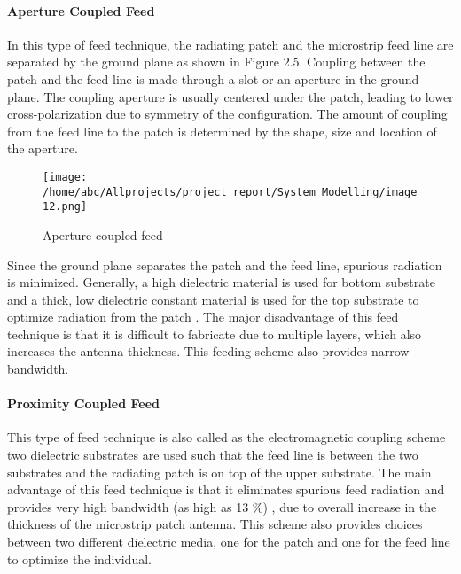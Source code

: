 \documentclass[12pt]{article}
\begin{document}
					                   
					                \paragraph{Aperture Coupled Feed}
					                 \justify
					                  In this type of feed technique, the radiating patch and the microstrip feed line are separated by the ground plane as shown in Figure 2.5. Coupling between the patch and the feed line is made through a slot or an aperture in the ground plane.  The coupling aperture is usually centered under the patch, leading to lower cross-polarization due to symmetry of the configuration. The amount of coupling from the feed line to the patch is determined by the shape, size and location of the aperture.
					                  
					                    \begin{figure}[H]
					                    	\centering
					                    	\texttt{[image: /home/abc/Allprojects/project\_report/System\_Modelling/image12.png]}
					                    	\caption{Aperture-coupled feed }	             	
					                    \end{figure}
					                    
					                   Since the ground plane separates the patch and the feed line, spurious radiation is minimized. Generally, a high dielectric material is used for bottom substrate and a thick, low dielectric constant material is used for the top substrate to optimize radiation from the patch . The major disadvantage of this feed technique is that it is difficult to fabricate due to multiple layers, which also increases the antenna thickness. This feeding scheme also provides narrow bandwidth.
					                  
					                 \paragraph{ Proximity Coupled Feed}
					                  \justify
					                   This type of feed technique is also called as the electromagnetic coupling scheme two dielectric substrates are used such that the feed line is between the two substrates and the radiating patch is on top of the upper substrate. The main advantage of this feed technique is that it eliminates spurious feed radiation and provides very high bandwidth (as high as 13 \%) , due to overall increase in the thickness of the microstrip patch antenna. This scheme also provides choices between two different dielectric media, one for the patch and one for the feed line to optimize the individual.
					                   
\end{document}
